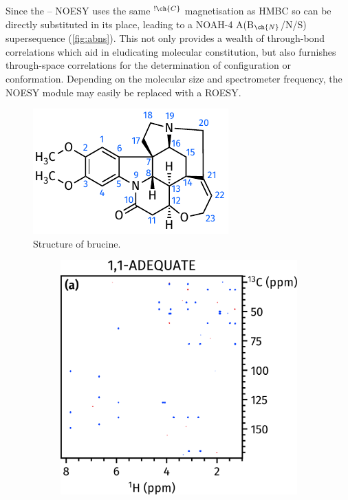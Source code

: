 \documentclass[a4paper,12pt]{article}
\newcommand{\proton}{\ch{^{1}H}}
\newcommand{\carbon}{\ch{^{13}C}}
\newcommand{\magnnot}[1]{\ch{^1H}$^{!#1}$}
\newcommand{\abnns}{NOAH-4 A(B$_{\ch{N}}$/N/S)}
\begin{document}
\begin{refsection}
Since the \proton{}--\proton{} NOESY uses the same \magnnot{\ch{C}} magnetisation as \carbon{} HMBC so can be directly substituted in its place, leading to a \abnns{} supersequence (\cref{fig:abns}).
This not only provides a wealth of through-bond correlations which aid in eludicating molecular constitution, but also furnishes through-space correlations for the determination of configuration or conformation.
Depending on the molecular size and spectrometer frequency, the NOESY module may easily be replaced with a ROESY.

\begin{figure}[!ht]
    \centering
    \includegraphics[]{brucine.pdf}%
    \caption[Structure of brucine]{
        Structure of brucine.
    }
    \label{fig:samples_brucine}
\end{figure}

\clearpage 
\begin{figure}[htb]
    \begin{subfigure}[b]{\textwidth}
        \centering
        \includegraphics[]{abns_1.png}%
    \end{subfigure}
\end{figure}


\end{refsection}
\end{document}
